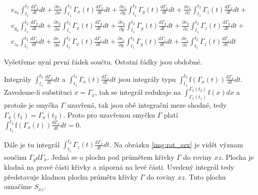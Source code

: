 \documentclass{book}
\begin{document}
\begin{equation}
\label{eq:rotace_2}
\begin{matrix}
v_{x_0} \int_{t_1}^{t_2} \frac{d \Gamma_x}{dt} dt + \frac{\partial v_x}{\partial x} \int_{t_1}^{t_2} \Gamma_x(t) \frac{d \Gamma_x}{dt} dt + \frac{\partial v_x}{\partial y} \int_{t_1}^{t_2} \Gamma_y(t) \frac{d \Gamma_x}{dt} dt + \frac{\partial v_x}{\partial z} \int_{t_1}^{t_2} \Gamma_z(t) \frac{d \Gamma_x}{dt} dt + \\
v_{y_0} \int_{t_1}^{t_2} \frac{d \Gamma_y}{dt} dt + \frac{\partial v_y}{\partial x} \int_{t_1}^{t_2} \Gamma_x(t) \frac{d \Gamma_y}{dt} dt + \frac{\partial v_y}{\partial y} \int_{t_1}^{t_2} \Gamma_y(t) \frac{d \Gamma_y}{dt} dt + \frac{\partial v_y}{\partial z} \int_{t_1}^{t_2} \Gamma_z(t) \frac{d \Gamma_y}{dt} dt + \\
v_{z_0} \int_{t_1}^{t_2} \frac{d \Gamma_z}{dt} dt + \frac{\partial v_z}{\partial x} \int_{t_1}^{t_2} \Gamma_x(t) \frac{d \Gamma_z}{dt} dt + \frac{\partial v_z}{\partial y} \int_{t_1}^{t_2} \Gamma_y(t) \frac{d \Gamma_z}{dt} dt + \frac{\partial v_z}{\partial z} \int_{t_1}^{t_2} \Gamma_z(t) \frac{d \Gamma_z}{dt} dt
\end{matrix}
\end{equation}

Vyšetřeme nyní první řádek součtu. Ostatní řádky jsou obdobné.

Integrály \(\int_{t_1}^{t_2} \frac{d \Gamma_x}{dt} dt\) a \(\int_{t_1}^{t_2} \Gamma_x(t) \frac{d \Gamma_x}{dt} dt\) jsou integrály typu \(\int_{t_1}^{t_2} \mathrm{f}(\Gamma_x(t)) \frac{d \Gamma_x}{dt} dt\). Zavedeme-li substituci \(x = \Gamma_x\), tak se integrál redukuje na \(\int_{\Gamma_x(t_1)}^{\Gamma_x(t_2)} \mathrm{f}(x) dx\) a protože je smyčka \(\Gamma\) uzavřená, tak jsou obě integrační meze shodné, tedy \(\Gamma_x(t_1) = \Gamma_x(t_2)\). Proto pro uzavřenou smyčku \(\Gamma\) platí \(\int_{t_1}^{t_2} \mathrm{f}(\Gamma_x(t)) \frac{d \Gamma_x}{dt} dt = 0\).

Dále je tu integrál \(\int_{t_1}^{t_2} \Gamma_z(t) \frac{d \Gamma_x}{dt} dt\). Na obrázku \ref{img:rot_szx} je vidět význam součinu \(\Gamma_y d \Gamma_x\). Jedná se o plochu pod průmětem křivky \(\Gamma\) do roviny \(xz\). Plocha je kladná na pravé části křivky a záporná na levé části. Uvedený integrál tedy představuje kladnou plochu průmětu křivky \(\Gamma\) do roviny \(xz\). Tuto plochu označíme \(S_{xz}\).
\end{document}
